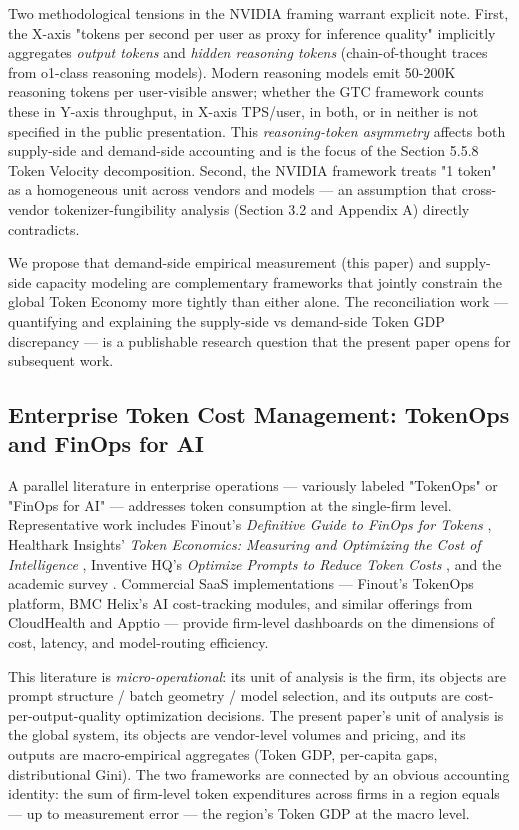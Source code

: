 \documentclass[11pt,a4paper]{article}
\begin{document}
Two methodological tensions in the NVIDIA framing warrant explicit note. First, the X-axis "tokens per second per user as proxy for inference quality" implicitly aggregates \emph{output tokens} and \emph{hidden reasoning tokens} (chain-of-thought traces from o1-class reasoning models). Modern reasoning models emit 50-200K reasoning tokens per user-visible answer; whether the GTC framework counts these in Y-axis throughput, in X-axis TPS/user, in both, or in neither is not specified in the public presentation. This \emph{reasoning-token asymmetry} affects both supply-side and demand-side accounting and is the focus of the Section 5.5.8 Token Velocity decomposition. Second, the NVIDIA framework treats "1 token" as a homogeneous unit across vendors and models --- an assumption that cross-vendor tokenizer-fungibility analysis (Section 3.2 and Appendix A) directly contradicts.

We propose that demand-side empirical measurement (this paper) and supply-side capacity modeling \cite{litowitz2026photons, huang2026gtc} are complementary frameworks that jointly constrain the global Token Economy more tightly than either alone. The reconciliation work --- quantifying and explaining the supply-side vs demand-side Token GDP discrepancy --- is a publishable research question that the present paper opens for subsequent work.

\subsection{Enterprise Token Cost Management: TokenOps and FinOps for AI}

A parallel literature in enterprise operations --- variously labeled "TokenOps" or "FinOps for AI" --- addresses token consumption at the single-firm level. Representative work includes Finout's \emph{Definitive Guide to FinOps for Tokens} \cite{finout2024tokenops}, Healthark Insights' \emph{Token Economics: Measuring and Optimizing the Cost of Intelligence} \cite{healthark2025tokenecon}, Inventive HQ's \emph{Optimize Prompts to Reduce Token Costs} \cite{inventivehq2025promptopt}, and the academic survey \cite{tokenfinops2025survey}. Commercial SaaS implementations --- Finout's TokenOps platform, BMC Helix's AI cost-tracking modules, and similar offerings from CloudHealth and Apptio --- provide firm-level dashboards on the dimensions of cost, latency, and model-routing efficiency.

This literature is \emph{micro-operational}: its unit of analysis is the firm, its objects are prompt structure / batch geometry / model selection, and its outputs are cost-per-output-quality optimization decisions. The present paper's unit of analysis is the global system, its objects are vendor-level volumes and pricing, and its outputs are macro-empirical aggregates (Token GDP, per-capita gaps, distributional Gini). The two frameworks are connected by an obvious accounting identity: the sum of firm-level token expenditures across firms in a region equals --- up to measurement error --- the region's Token GDP at the macro level.
\end{document}
